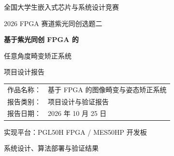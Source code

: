 \documentclass[UTF8,a4paper,12pt,oneside,openany,fontset=none]{ctexrep}
\begin{document}
\begin{titlepage}
  \centering
  \vspace*{1cm}
  {\Large 全国大学生嵌入式芯片与系统设计竞赛\par}
  \vspace{0.5cm}
  {\large 2026 FPGA 赛道\quad 紫光同创选题二\par}
  \vspace{2cm}
  {\Huge\bfseries 基于紫光同创 FPGA 的\par 任意角度畸变矫正系统\par}
  \vspace{0.7cm}
  {\LARGE 项目设计报告\par}
  \vspace{1.4cm}
  \begin{tabular}{rl}
    作品名称： & 基于 FPGA 的图像畸变与姿态矫正系统 \\
    报告类别： & 项目设计与验证报告 \\
    报告日期： & 2026 年 10 月 25 日
  \end{tabular}
  \vfill
  {\small 实现平台：PGL50H FPGA / MES50HP 开发板\par}
  {\small 系统设计、算法部署与验证结果\par}
\end{titlepage}

\tableofcontents
\clearpage
{}









\appendix



\end{document}

